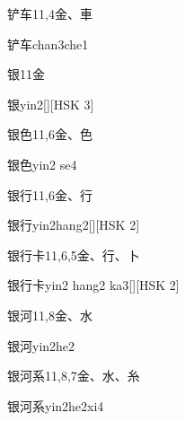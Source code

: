 \begin{Entry}{铲车}{11,4}{⾦、⾞}
  \begin{Phonetics}{铲车}{chan3che1}
  \end{Phonetics}
\end{Entry}

\begin{Entry}{银}{11}{⾦}
  \begin{Phonetics}{银}{yin2}[][HSK 3]
  \end{Phonetics}
\end{Entry}

\begin{Entry}{银色}{11,6}{⾦、⾊}
  \begin{Phonetics}{银色}{yin2 se4}
  \end{Phonetics}
\end{Entry}

\begin{Entry}{银行}{11,6}{⾦、⾏}
  \begin{Phonetics}{银行}{yin2hang2}[][HSK 2]
  \end{Phonetics}
\end{Entry}

\begin{Entry}{银行卡}{11,6,5}{⾦、⾏、⼘}
  \begin{Phonetics}{银行卡}{yin2 hang2 ka3}[][HSK 2]
  \end{Phonetics}
\end{Entry}

\begin{Entry}{银河}{11,8}{⾦、⽔}
  \begin{Phonetics}{银河}{yin2he2}
  \end{Phonetics}
\end{Entry}

\begin{Entry}{银河系}{11,8,7}{⾦、⽔、⽷}
  \begin{Phonetics}{银河系}{yin2he2xi4}
  \end{Phonetics}
\end{Entry}

